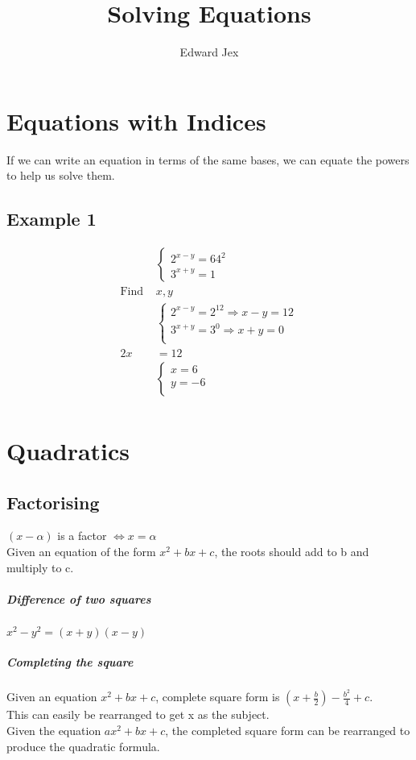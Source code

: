 \documentclass[a4paper,12pt]{article}
\begin{document}
\title{Solving Equations}	
\author{Edward Jex}
\maketitle
\section*{Equations with Indices}
If we can write an equation in terms of the same bases, we can equate the powers to help us solve them.
\subsection*{Example 1}
\begin{align*}
&\begin{cases}
	2^{x-y} = 64^2 \\
	3^{x+y} = 1
\end{cases} \\
\text{Find } &  x, y \\
&\begin{cases}
	2^{x-y} = 2^12 \Rightarrow x-y = 12 \\
	3^{x+y} = 3^0 \Rightarrow x+y = 0 \\
\end{cases} \\
2x & = 12 \\
&\begin{cases}
	x = 6 \\
	y = -6 \\
\end{cases} \\
\end{align*}
\section*{Quadratics}
\subsection*{Factorising}
$(x - \alpha)$ is a factor $\iff x = \alpha$ \\
Given an equation of the form $x^2 + bx + c$, the roots should add to b and multiply to c.
\subparagraph*{Difference of two squares}
$x^2 - y^2 = (x+y)(x-y)$
\subparagraph*{Completing the square}
Given an equation $x^2 + bx + c$, complete square form is $(x + \frac{b}{2}) - \frac{b^2}{4} + c$. \\
This can easily be rearranged to get x as the subject. \\
Given the equation $ax^2 + bx +c$, the completed square form can be rearranged to produce the quadratic formula.
\end{document}
